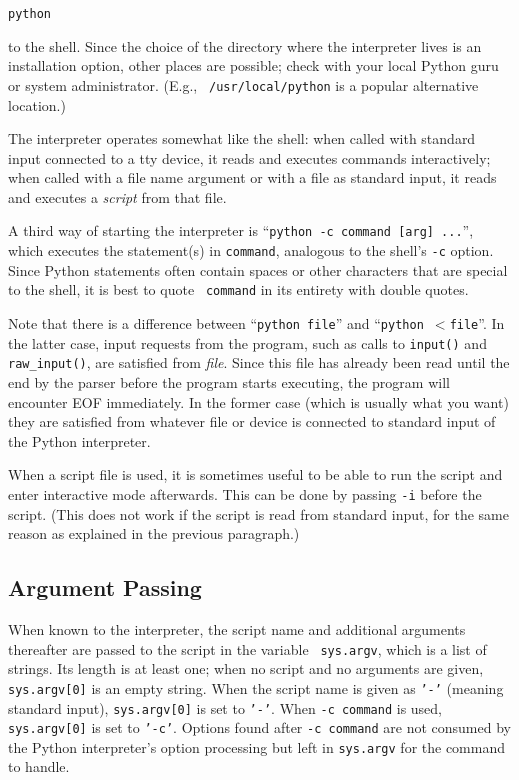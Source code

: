\bcode\begin{verbatim}
python
\end{verbatim}\ecode
%
to the shell.  Since the choice of the directory where the interpreter
lives is an installation option, other places are possible; check with
your local Python guru or system administrator.  (E.g., {\tt
/usr/local/python} is a popular alternative location.)

The interpreter operates somewhat like the {\UNIX} shell: when called
with standard input connected to a tty device, it reads and executes
commands interactively; when called with a file name argument or with
a file as standard input, it reads and executes a {\em script} from
that file.

A third way of starting the interpreter is
``{\tt python -c command [arg] ...}'', which
executes the statement(s) in {\tt command}, analogous to the shell's
{\tt -c} option.  Since Python statements often contain spaces or other
characters that are special to the shell, it is best to quote {\tt
command} in its entirety with double quotes.

Note that there is a difference between ``{\tt python file}'' and
``{\tt python $<$file}''.  In the latter case, input requests from the
program, such as calls to {\tt input()} and {\tt raw_input()}, are
satisfied from {\em file}.  Since this file has already been read
until the end by the parser before the program starts executing, the
program will encounter EOF immediately.  In the former case (which is
usually what you want) they are satisfied from whatever file or device
is connected to standard input of the Python interpreter.

When a script file is used, it is sometimes useful to be able to run
the script and enter interactive mode afterwards.  This can be done by
passing {\tt -i} before the script.  (This does not work if the script
is read from standard input, for the same reason as explained in the
previous paragraph.)

\subsection{Argument Passing}

When known to the interpreter, the script name and additional
arguments thereafter are passed to the script in the variable {\tt
sys.argv}, which is a list of strings.  Its length is at least one;
when no script and no arguments are given, {\tt sys.argv[0]} is an
empty string.  When the script name is given as {\tt '-'} (meaning
standard input), {\tt sys.argv[0]} is set to {\tt '-'}.  When {\tt -c
command} is used, {\tt sys.argv[0]} is set to {\tt '-c'}.  Options
found after {\tt -c command} are not consumed by the Python
interpreter's option processing but left in {\tt sys.argv} for the
command to handle.

